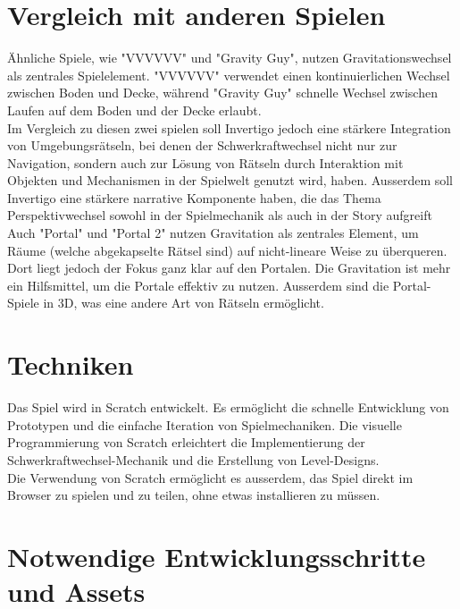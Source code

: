 \documentclass{article}
\begin{document}
\section{Vergleich mit anderen Spielen}

Ähnliche Spiele, wie "VVVVVV" und "Gravity Guy", nutzen Gravitationswechsel als zentrales Spielelement.
"VVVVVV" verwendet einen kontinuierlichen Wechsel zwischen Boden und Decke, während "Gravity Guy" schnelle Wechsel zwischen Laufen auf dem Boden und der Decke erlaubt.
\\
Im Vergleich zu diesen zwei spielen soll Invertigo jedoch eine stärkere Integration von Umgebungsrätseln, bei denen der Schwerkraftwechsel nicht nur zur Navigation,
sondern auch zur Lösung von Rätseln durch Interaktion mit Objekten und Mechanismen in der Spielwelt genutzt wird, haben.
Ausserdem soll Invertigo eine stärkere narrative Komponente haben, die das Thema Perspektivwechsel sowohl in der Spielmechanik als auch in der Story aufgreift
\\
Auch "Portal" und "Portal 2" nutzen Gravitation als zentrales Element, um Räume (welche abgekapselte Rätsel sind) auf nicht-lineare Weise zu überqueren.
Dort liegt jedoch der Fokus ganz klar auf den Portalen. Die Gravitation ist mehr ein Hilfsmittel, um die Portale effektiv zu nutzen.
Ausserdem sind die Portal-Spiele in 3D, was eine andere Art von Rätseln ermöglicht.

\section{Techniken}
Das Spiel wird in Scratch entwickelt.
Es ermöglicht die schnelle Entwicklung von Prototypen und die einfache Iteration von Spielmechaniken.
Die visuelle Programmierung von Scratch erleichtert die Implementierung der Schwerkraftwechsel-Mechanik und die Erstellung von Level-Designs.
\\
Die Verwendung von Scratch ermöglicht es ausserdem, das Spiel direkt im Browser zu spielen und zu teilen, ohne etwas installieren zu müssen.

\section{Notwendige Entwicklungsschritte und Assets}
\end{document}
